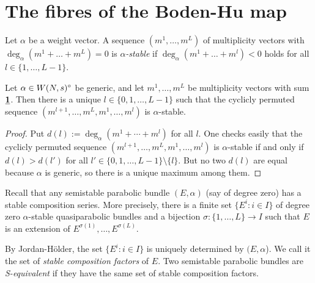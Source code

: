 \documentclass{article}
\begin{document}
\section{The fibres of the Boden-Hu map} \label{fibres}

\begin{defn} \label{def_stable}
  Let $\alpha$ be a weight vector. A sequence $(m^1, \ldots, m^L)$ of multiplicity vectors with $\deg_{\alpha}(m^1 + \ldots + m^L) = 0$ is
  \emph{$\alpha$-stable} if $\deg_{\alpha}(m^1 + \ldots + m^l) < 0$ holds for all $l \in \{1, \ldots, L-1\}$.
\end{defn}

\begin{lemma} \label{count_stables}
  Let $\alpha \in W(N, s)^{\circ}$ be generic, and let $m^1, \ldots, m^L$ be multiplicity vectors with sum $\underline{\mathbf{1}}$. Then there is a unique $l \in \{0, 1,
  \ldots, L-1\}$ such that the cyclicly permuted sequence $(m^{l+1}, \ldots, m^L, m^1, \ldots, m^l)$ is $\alpha$-stable.
\end{lemma}
\begin{proof}
  Put $d(l) := \deg_{\alpha}(m^1 + \cdots + m^l)$ for all $l$. One checks easily that the cyclicly permuted sequence $(m^{l+1}, \ldots, m^L, m^1, \ldots,
  m^l)$ is $\alpha$-stable if and only if $d(l) > d(l')$ for all $l' \in \{0, 1, \ldots, L-1\} \setminus \{l\}$. But no two $d(l)$ are equal because
  $\alpha$ is generic, so there is a unique maximum among them.
\end{proof}

Recall that any semistable parabolic bundle $(E, \alpha)$ (say of degree zero) has a stable composition series. More precisely, there is a finite set
$\{E^i: i \in I\}$ of degree zero $\alpha$-stable quasiparabolic bundles and a bijection $\sigma: \{1, \ldots, L\} \to I$ such that $E$ is an extension
of $E^{\sigma(1)}, \ldots, E^{\sigma(L)}$.

By Jordan-H\"older, the set $\{E^i: i \in I\}$ is uniquely determined by $(E, \alpha$). We call it the set of \emph{stable composition factors} of $E$.
Two semistable parabolic bundles are \emph{S-equivalent} if they have the same set of stable composition factors.
\end{document}
